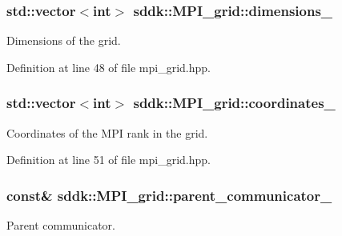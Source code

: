 \subsubsection[{dimensions\+\_\+}]{\setlength{\rightskip}{0pt plus 5cm}std\+::vector$<$int$>$ sddk\+::\+M\+P\+I\+\_\+grid\+::dimensions\+\_\+\hspace{0.3cm}{\ttfamily [private]}}\label{classsddk_1_1_m_p_i__grid_aafe8dc9a3b9a4e385623e8cead774e15}


Dimensions of the grid. 



Definition at line 48 of file mpi\+\_\+grid.\+hpp.

\hypertarget{classsddk_1_1_m_p_i__grid_a1380d50484c89e5d92d8ff48b83f2f96}{}
\subsubsection[{coordinates\+\_\+}]{\setlength{\rightskip}{0pt plus 5cm}std\+::vector$<$int$>$ sddk\+::\+M\+P\+I\+\_\+grid\+::coordinates\+\_\+\hspace{0.3cm}{\ttfamily [private]}}\label{classsddk_1_1_m_p_i__grid_a1380d50484c89e5d92d8ff48b83f2f96}


Coordinates of the M\+P\+I rank in the grid. 



Definition at line 51 of file mpi\+\_\+grid.\+hpp.

\hypertarget{classsddk_1_1_m_p_i__grid_ab1312fd9c4883639d426d756565409be}{}
\subsubsection[{parent\+\_\+communicator\+\_\+}]{ const\& sddk\+::\+M\+P\+I\+\_\+grid\+::parent\+\_\+communicator\+\_\+\hspace{0.3cm}{\ttfamily [private]}}\label{classsddk_1_1_m_p_i__grid_ab1312fd9c4883639d426d756565409be}


Parent communicator. 



